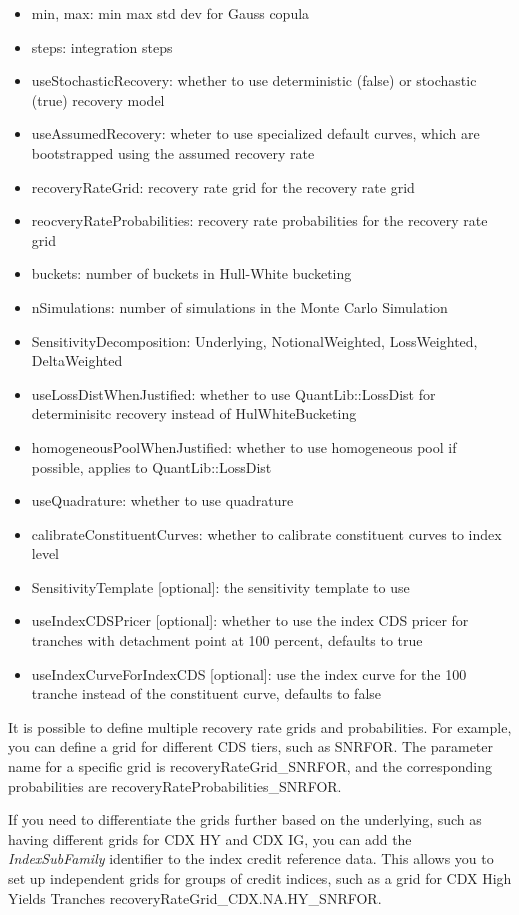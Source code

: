 \begin{itemize}
\item min, max: min max std dev for Gauss copula
\item steps: integration steps
\item useStochasticRecovery: whether to use deterministic (false) or stochastic (true) recovery model
\item useAssumedRecovery: wheter to use specialized default curves, which are bootstrapped using the assumed recovery rate
\item recoveryRateGrid: recovery rate grid for the recovery rate grid
\item reocveryRateProbabilities: recovery rate probabilities for the recovery rate grid
\item buckets: number of buckets in Hull-White bucketing
\item nSimulations: number of simulations in the Monte Carlo Simulation
\item SensitivityDecomposition: Underlying, NotionalWeighted, LossWeighted, DeltaWeighted
\item useLossDistWhenJustified: whether to use QuantLib::LossDist for determinisitc recovery instead of HulWhiteBucketing
\item homogeneousPoolWhenJustified: whether to use homogeneous pool if possible, applies to QuantLib::LossDist
\item useQuadrature: whether to use quadrature
\item calibrateConstituentCurves: whether to calibrate constituent curves to index level
\item SensitivityTemplate [optional]: the sensitivity template to use 
\item useIndexCDSPricer [optional]: whether to use the index CDS pricer for tranches with detachment point at 100 percent, defaults to true
\item useIndexCurveForIndexCDS [optional]: use the index curve for the 100 tranche instead of the constituent curve, defaults to false
\end{itemize}

It is possible to define multiple recovery rate grids and probabilities. 
For example, you can define a grid for different CDS tiers, such as SNRFOR. The parameter name for a specific grid is recoveryRateGrid\_SNRFOR, 
and the corresponding probabilities are recoveryRateProbabilities\_SNRFOR.

If you need to differentiate the grids further based on the underlying, such as having different grids for CDX HY and CDX IG,
you can add the \emph{IndexSubFamily} identifier to the index credit reference data. 
This allows you to set up independent grids for groups of credit indices, 
such as a grid for CDX High Yields Tranches recoveryRateGrid\_CDX.NA.HY\_SNRFOR.

